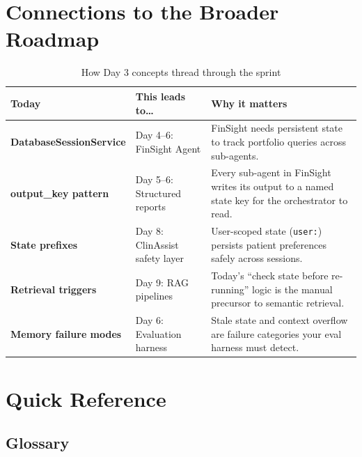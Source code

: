 \documentclass[12pt, a4paper]{article}
\begin{document}
\vspace{1.5em}

\section{Connections to the Broader Roadmap}

\begin{table}[h!]
\centering
\small
\begin{tabular}{>{\bfseries}p{2.5cm} p{4.5cm} p{5cm}}
\toprule
\textbf{Today} & \textbf{This leads to\ldots} & \textbf{Why it matters} \\
\midrule
DatabaseSessionService & Day 4--6: FinSight Agent & FinSight needs persistent state to track portfolio queries across sub-agents. \\
\addlinespace
output\_key pattern & Day 5--6: Structured reports & Every sub-agent in FinSight writes its output to a named state key for the orchestrator to read. \\
\addlinespace
State prefixes & Day 8: ClinAssist safety layer & User-scoped state (\texttt{user:}) persists patient preferences safely across sessions. \\
\addlinespace
Retrieval triggers & Day 9: RAG pipelines & Today's ``check state before re-running'' logic is the manual precursor to semantic retrieval. \\
\addlinespace
Memory failure modes & Day 6: Evaluation harness & Stale state and context overflow are failure categories your eval harness must detect. \\
\bottomrule
\end{tabular}
\caption{How Day 3 concepts thread through the sprint}
\end{table}

\section{Quick Reference}

\subsection*{Glossary}
\end{document}
